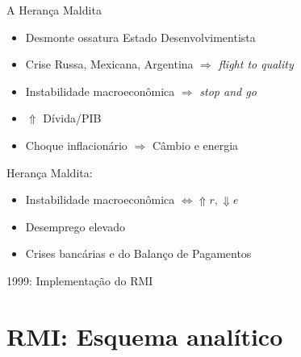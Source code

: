 \documentclass[presentation]{beamer}
\begin{document}
\begin{frame}[label={sec:orgd694309}]{A Herança Maldita \cite{belluzzoDepoisQuedaEconomia2002}}
\begin{itemize}
\item Desmonte ossatura Estado Desenvolvimentista
\item Crise Russa, Mexicana, Argentina \(\Rightarrow\) \emph{flight to quality}
\item Instabilidade macroeconômica \(\Rightarrow\) \emph{stop and go}
\item \(\Uparrow\) Dívida/PIB
\item Choque inflacionário \(\Rightarrow\) Câmbio e energia
\end{itemize}

\alert{Herança Maldita:}

\begin{itemize}
\item Instabilidade macroeconômica \(\Leftrightarrow \Uparrow r, \Downarrow e\)
\item Desemprego elevado
\item Crises bancárias e do Balanço de Pagamentos
\end{itemize}

\begin{block}{1999: Implementação do RMI}
\end{block}
\end{frame}

\section{RMI: Esquema analítico}
\label{sec:org1731fb2}
\end{document}
